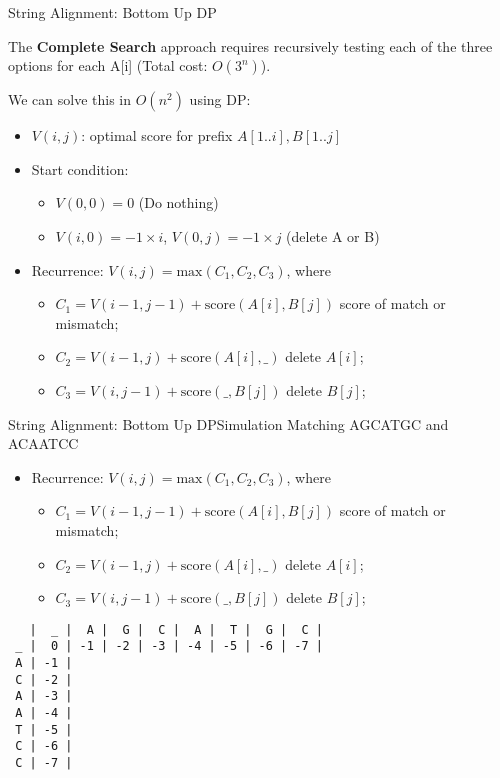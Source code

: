 \begin{frame}[fragile]{String Alignment: Bottom Up DP}

  The {\bf Complete Search} approach requires recursively testing each of the three options for each A[i] (Total cost: $O(3^n)$).\bigskip

  We can solve this in $O(n^2)$ using DP:

  \begin{itemize}
    \item $V(i,j)$: optimal score for prefix $A[1..i],B[1..j]$
    \item Start condition:
    \begin{itemize}
      \item $V(0,0) = 0$ \hspace{1cm} (Do nothing)
      \item $V(i,0) = -1\times i$, $V(0,j) = -1\times j$ \hfill (delete A or B)
    \end{itemize}
    \item Recurrence: $V(i,j) = \text{max}(C_1, C_2, C_3)$, where
    \begin{itemize}
      \item $C_1 = V(i-1, j-1) + \text{score}(A[i],B[j])$ \hfill score of match or mismatch;
      \item $C_2 = V(i-1,j) + \text{score}(A[i],\_)$ \hfill delete $A[i]$;
      \item $C_3 = V(i,j-1) + \text{score}(\_,B[j])$ \hfill delete $B[j]$;
    \end{itemize}
  \end{itemize}
\end{frame}


\begin{frame}[fragile]{String Alignment: Bottom Up DP}{Simulation Matching AGCATGC and ACAATCC}

\begin{itemize}
  \item Recurrence: $V(i,j) = \text{max}(C_1, C_2, C_3)$, where
  \begin{itemize}
    \item $C_1 = V(i-1, j-1) + \text{score}(A[i],B[j])$ \hfill score of match or mismatch;
    \item $C_2 = V(i-1,j) + \text{score}(A[i],\_)$ \hfill delete $A[i]$;
    \item $C_3 = V(i,j-1) + \text{score}(\_,B[j])$ \hfill delete $B[j]$;
  \end{itemize}
\end{itemize}

\begin{verbatim}
   |  _ |  A |  G |  C |  A |  T |  G |  C |
 _ |  0 | -1 | -2 | -3 | -4 | -5 | -6 | -7 |
 A | -1 |
 C | -2 |
 A | -3 |
 A | -4 |
 T | -5 |
 C | -6 |
 C | -7 |
\end{verbatim}

\end{frame}


